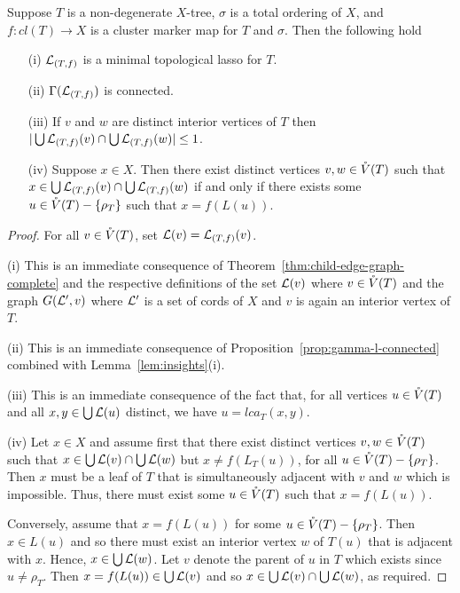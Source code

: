 \begin{lem}
  \label{lem:insights}
  Suppose $T$ is a non-degenerate $X$-tree, $\sigma$ is a total ordering of
  $X$, and $f:cl(T)\to X$ is a cluster marker map for $T$ and $\sigma$. Then
  the following hold
  \begin{enumerate}
  \item[(i)] ${\mathcal L}_{(T,f)}$ is a minimal topological lasso for $T$.
  \item[(ii)] $\Gamma({\mathcal L}_{(T,f)})$ is connected.
  \item[(iii)] If $v$ and $w$ are distinct interior vertices of $T$ then
    $|\bigcup {\mathcal L}_{(T,f)}(v)\cap \bigcup {\mathcal L}_{(T,f)}(w)|\leq 1$.
  \item[(iv)] Suppose $x\in X$. Then there exist distinct vertices $v,w\in
    \mathring{V}(T)$ such that $x\in \bigcup {\mathcal L}_{(T,f)}(v)\cap \bigcup {\mathcal L}_{(T,f)}(w)$
    if and only if there exists some $u\in \mathring{V}(T)-\{\rho_T\}$ such that
    $x=f(L(u))$.
  \end{enumerate}
\end{lem}
\begin{proof}
  For all $v\in \mathring{V}(T)$, set ${\mathcal L}(v)={\mathcal L}_{(T,f)}(v)$.

  (i) This is an immediate consequence of
  Theorem~\ref{thm:child-edge-graph-complete} and the respective definitions
  of the set ${\mathcal L}(v)$ where $v\in \mathring{V}(T)$ and the graph $G({\mathcal L}',v)$ where
  ${\mathcal L}'$ is a set of cords of $X$ and $v$ is again an interior vertex of $T$.
 

  (ii) This is an immediate consequence of
  Proposition~\ref{prop:gamma-l-connected} combined with
  Lemma~\ref{lem:insights}(i).


  (iii) This is an immediate consequence of the fact that, for all vertices
  $u\in \mathring{V}(T)$ and all $x,y\in \bigcup{\mathcal L}(u)$ distinct, we have
  $u=lca_T(x,y)$.

  (iv) Let $x\in X$ and assume first that there exist distinct vertices
  $v,w\in \mathring{V}(T)$ such that $x\in \bigcup {\mathcal L}(v)\cap \bigcup {\mathcal L}(w)$ but
  $x\not =f(L_T(u))$, for all $u\in \mathring{V}(T)-\{\rho_T\}$. Then $x$ must be a
  leaf of $T$ that is simultaneously adjacent with $v$ and $w$ which is
  impossible. Thus, there must exist some $u\in \mathring{V}(T)$ such that $x=f(L(u))$.

  Conversely, assume that $x=f(L(u))$ for some $u\in \mathring{V}(T)-\{\rho_T\}$. Then
  $x\in L(u)$ and so there must exist an interior vertex $w$ of $T(u)$ that is
  adjacent with $x$.  Hence, $x\in\bigcup {\mathcal L}(w)$.  Let $v$ denote the parent
  of $u$ in $T$ which exists since $u\not=\rho_T$.  Then $x=f(L(u))\in \bigcup
  {\mathcal L}(v)$ and so $x\in \bigcup {\mathcal L}(v)\cap \bigcup {\mathcal L}(w)$, as required.
\end{proof}

